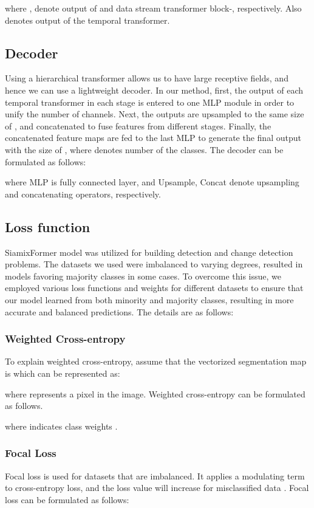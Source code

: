 \documentclass{article}
\begin{document}
where ,  denote output of  and  data stream transformer block-, respectively. Also  denotes output of the  temporal transformer.

\subsection{Decoder}\label{decsec}
Using a hierarchical transformer allows us to have large receptive fields, and hence we can use a lightweight decoder. In our method, first, the output of each temporal transformer in each stage is entered to one MLP module in order to unify the number of channels. Next, the outputs are upsampled to the same size of , and concatenated to fuse features from different stages. 
Finally, the concatenated feature maps are fed to the last MLP to generate the final output with the size of , where  denotes number of the classes. The decoder can be formulated as follows:

where MLP is fully connected layer, and Upsample, Concat denote upsampling and concatenating operators, respectively.

\subsection{Loss function}
SiamixFormer model was utilized for building detection and change detection problems. The datasets we used were imbalanced to varying degrees, resulted in models favoring majority classes in some cases. To overcome this issue, we employed various loss functions and weights for different datasets to ensure that our model learned from both minority and majority classes, resulting in more accurate and balanced predictions. The details are as follows:

\subsubsection{Weighted Cross-entropy}
To explain weighted cross-entropy, assume that the vectorized segmentation map is 
which can be represented as:

where  represents a pixel in the image. Weighted cross-entropy can be formulated as follows.

where  indicates class weights \cite{pihur2007weighted}.
\subsubsection{Focal Loss}
Focal loss is used for datasets that are imbalanced. It applies a modulating term to cross-entropy loss, and the loss value will increase for misclassified data \cite{lin2017focal}. Focal loss can be formulated as follows:
\end{document}
